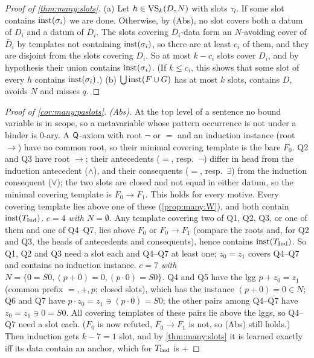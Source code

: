 \begin{proof}[Proof of \cref{thm:many:slots}]
(a) Let $h\in\mathrm{VS}_k(D,N)$ with slots $\tau_l$. If some slot contains $\mathrm{inst}(\sigma_i)$ we are done. Otherwise, by (Abs),
no slot covers both a datum of $D_i$ and a datum of $\bar D_i$. The slots covering $\bar D_i$-data form an $N$-avoiding
cover of $\bar D_i$ by templates not containing $\mathrm{inst}(\sigma_i)$, so there are at least $c_i$ of them, and they are
disjoint from the slots covering $D_i$. So at most $k-c_i$ slots cover $D_i$, and by hypothesis their union contains
$\mathrm{inst}(\sigma_i)$. (If $k\le c_i$, this shows that some slot of every $h$ contains $\mathrm{inst}(\sigma_i)$.)
(b) $\bigcup\mathrm{inst}(F\cup G)$ has at most $k$ slots, contains $D$, avoids $N$ and misses $q$.
\end{proof}

\begin{proof}[Proof of \cref{cor:many:paslots}]
\emph{(Abs).} At the top level of a sentence no bound variable is in scope, so a metavariable whose pattern occurrence
is not under a binder is 0-ary. A $\mathsf{Q}$-axiom with root $\neg$ or $=$ and an induction instance (root $\to$) have no common
root, so their minimal covering template is the bare $F_0$. Q2 and Q3 have root $\to$; their antecedents ($=$, resp.\
$\neg$) differ in head from the induction antecedent ($\wedge$), and their consequents ($=$, resp.\ $\exists$) from the
induction consequent ($\forall$); the two slots are closed and not equal in either datum, so the minimal covering template
is $F_0\to F_1$. This holds for every motive. Every covering template lies above one of these (\cref{prop:many:W}), and
both contain $\mathrm{inst}(T_{\mathrm{Ind}})$.
\emph{$c=4$ with $N=\emptyset$.} Any template covering two of Q1, Q2, Q3, or one of them and one of Q4--Q7, lies above
$F_0$ or $F_0\to F_1$ (compare the roots and, for Q2 and Q3, the heads of antecedents and consequents), hence contains
$\mathrm{inst}(T_{\mathrm{Ind}})$. So Q1, Q2 and Q3 need a slot each and Q4--Q7 at least one; $z_0=z_1$ covers Q4--Q7 and contains no
induction instance. \emph{$c=7$ with $N=\{0=S0,(p+0)=0,(p\cdot0)=S0\}$.} Q4 and Q5 have the lgg $p+z_0=z_1$ (common prefix
$=,+,p$; closed slots), which has the instance $(p+0)=0\in N$; Q6 and Q7 have $p\cdot z_0=z_1\ni(p\cdot0)=S0$; the other
pairs among Q4--Q7 have $z_0=z_1\ni0=S0$. All covering templates of these pairs lie above the lggs, so Q4--Q7 need a slot
each. ($F_0$ is now refuted, $F_0\to F_1$ is not, so (Abs) still holds.) Then induction gets $k-7=1$ slot, and by
\cref{thm:many:slots} it is learned exactly iff its data contain an anchor, which for $T_{\mathrm{Ind}}$ is \evR{}+\evN{}

\end{proof}
